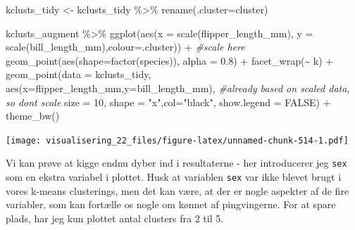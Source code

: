 \documentclass[
]{book}
\newenvironment{Shaded}{\begin{snugshade}}{\end{snugshade}}
\newcommand{\AttributeTok}[1]{\textcolor[rgb]{0.77,0.63,0.00}{#1}}
\newcommand{\CommentTok}[1]{\textcolor[rgb]{0.56,0.35,0.01}{\textit{#1}}}
\newcommand{\ConstantTok}[1]{\textcolor[rgb]{0.00,0.00,0.00}{#1}}
\newcommand{\DecValTok}[1]{\textcolor[rgb]{0.00,0.00,0.81}{#1}}
\newcommand{\FloatTok}[1]{\textcolor[rgb]{0.00,0.00,0.81}{#1}}
\newcommand{\FunctionTok}[1]{\textcolor[rgb]{0.00,0.00,0.00}{#1}}
\newcommand{\NormalTok}[1]{#1}
\newcommand{\OtherTok}[1]{\textcolor[rgb]{0.56,0.35,0.01}{#1}}
\newcommand{\SpecialCharTok}[1]{\textcolor[rgb]{0.00,0.00,0.00}{#1}}
\newcommand{\StringTok}[1]{\textcolor[rgb]{0.31,0.60,0.02}{#1}}
\begin{document}
\begin{Shaded}
\begin{Highlighting}[]
\NormalTok{kclusts\_tidy }\OtherTok{\textless{}{-}}\NormalTok{ kclusts\_tidy }\SpecialCharTok{\%\textgreater{}\%} \FunctionTok{rename}\NormalTok{(}\AttributeTok{.cluster=}\NormalTok{cluster)}

\NormalTok{kclusts\_augment }\SpecialCharTok{\%\textgreater{}\%} 
  \FunctionTok{ggplot}\NormalTok{(}\FunctionTok{aes}\NormalTok{(}\AttributeTok{x =} \FunctionTok{scale}\NormalTok{(flipper\_length\_mm), }\AttributeTok{y =} \FunctionTok{scale}\NormalTok{(bill\_length\_mm),}\AttributeTok{colour=}\NormalTok{.cluster)) }\SpecialCharTok{+} \CommentTok{\#scale here}
        \FunctionTok{geom\_point}\NormalTok{(}\FunctionTok{aes}\NormalTok{(}\AttributeTok{shape=}\FunctionTok{factor}\NormalTok{(species)), }\AttributeTok{alpha =} \FloatTok{0.8}\NormalTok{) }\SpecialCharTok{+} 
        \FunctionTok{facet\_wrap}\NormalTok{(}\SpecialCharTok{\textasciitilde{}}\NormalTok{ k) }\SpecialCharTok{+} 
        \FunctionTok{geom\_point}\NormalTok{(}\AttributeTok{data =}\NormalTok{ kclusts\_tidy,}
                   \FunctionTok{aes}\NormalTok{(}\AttributeTok{x=}\NormalTok{flipper\_length\_mm,}\AttributeTok{y=}\NormalTok{bill\_length\_mm), }\CommentTok{\#already based on scaled data, so don\textquotesingle{}t scale}
                   \AttributeTok{size =} \DecValTok{10}\NormalTok{, }\AttributeTok{shape =} \StringTok{"x"}\NormalTok{,}\AttributeTok{col=}\StringTok{"black"}\NormalTok{, }\AttributeTok{show.legend =} \ConstantTok{FALSE}\NormalTok{) }\SpecialCharTok{+} 
        \FunctionTok{theme\_bw}\NormalTok{()}
\end{Highlighting}
\end{Shaded}

\texttt{[image: visualisering\_22\_files/figure-latex/unnamed-chunk-514-1.pdf]}

Vi kan prøve at kigge endnu dyber ind i resultaterne - her introducerer jeg \texttt{sex} som en ekstra variabel i plottet. Husk at variablen \texttt{sex} var ikke blevet brugt i vores k-means clusterings, men det kan være, at der er nogle aspekter af de fire variabler, som kan fortælle os nogle om kønnet af pingvingerne. For at spare plads, har jeg kun plottet antal clusters fra 2 til 5.
\end{document}
